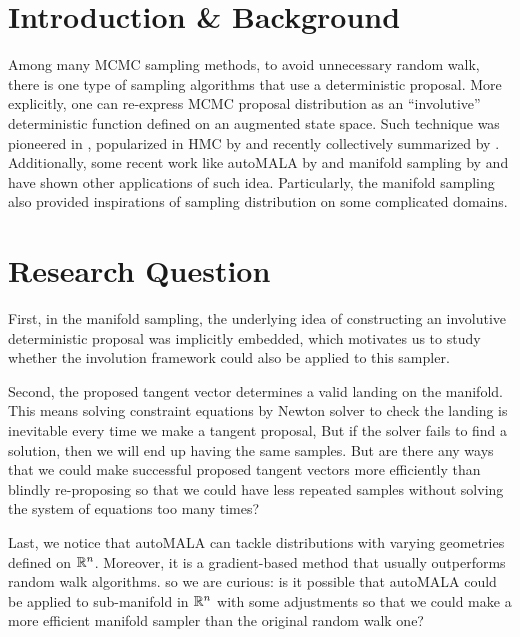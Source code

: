 \documentclass{article}
\begin{document}


\section{Introduction \& Background}
Among many MCMC sampling methods, to avoid unnecessary random walk, there is one type of sampling algorithms that use a deterministic proposal. More explicitly, one can re-express MCMC proposal distribution as an ``involutive'' deterministic function defined on an augmented state space. Such technique was pioneered in \cite{tierney1998}, popularized in HMC by \cite{nealHMC} and recently collectively summarized by \cite{involutiveMCMC}. Additionally, some recent work like autoMALA by \cite{automala} and manifold sampling by \cite{manifoldparent} and \cite{manifoldchild} have shown other applications of such idea. Particularly, the manifold sampling also provided inspirations of sampling distribution on some complicated domains.


\section{Research Question}
First, in the manifold sampling, the underlying idea of constructing an involutive deterministic proposal was implicitly embedded, which motivates us to study whether the involution framework could also be applied to this sampler.

Second, the proposed tangent vector determines a valid landing on the manifold. This means solving constraint equations by Newton solver to check the landing is inevitable every time we make a tangent proposal, But if the solver fails to find a solution, then we will end up having the same samples. But are there any ways that we could make successful proposed tangent vectors more efficiently than blindly re-proposing so that we could have less repeated samples without solving the system of equations too many times?

Last, we notice that autoMALA can tackle distributions with varying geometries defined on $\mathbb R^n$. Moreover, it is a gradient-based method that usually outperforms random walk algorithms. so we are curious: is it possible that autoMALA could be applied to sub-manifold in $\mathbb R^n$ with some adjustments so that we could make a more efficient manifold sampler than the original random walk one?
\end{document}
